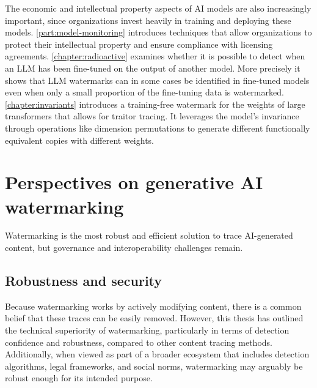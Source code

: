 The economic and intellectual property aspects of AI models are also increasingly important, since organizations invest heavily in training and deploying these models.
\autoref{part:model-monitoring} introduces techniques that allow organizations to protect their intellectual property and ensure compliance with licensing agreements.
\autoref{chapter:radioactive} examines whether it is possible to detect when an LLM has been fine-tuned on the output of another model. 
More precisely it shows that LLM watermarks can in some cases be identified in fine-tuned models even when only a small proportion of the fine-tuning data is watermarked.
\autoref{chapter:invariants} introduces a training-free watermark for the weights of large transformers that allows for traitor tracing.
It leverages the model's invariance through operations like dimension permutations to generate different functionally equivalent copies with different weights.








\section{Perspectives on generative AI watermarking}

Watermarking is the most robust and efficient solution to trace AI-generated content, but governance and interoperability challenges remain.

\subsection{Robustness and security}

Because watermarking works by actively modifying content, there is a common belief that these traces can be easily removed. 
However, this thesis has outlined the technical superiority of watermarking, particularly in terms of detection confidence and robustness, compared to other content tracing methods.
Additionally, when viewed as part of a broader ecosystem that includes detection algorithms, legal frameworks, and social norms, watermarking may arguably be robust enough for its intended purpose.

